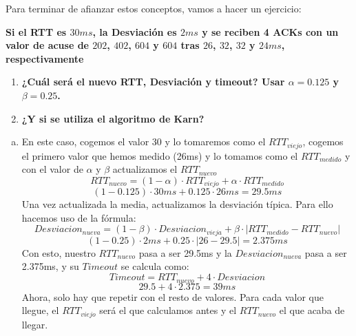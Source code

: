 \documentclass[10pt,a4paper,spanish]{report}
\begin{document}
Para terminar de afianzar estos conceptos, vamos a hacer un ejercicio: 

\textbf{Si el RTT es $30ms$, la Desviación es $2ms$ y se reciben 4 ACKs con un valor de acuse de $202$, $402$, $604$ y $604$ tras $26$, $32$, $32$ y $24 ms$, respectivamente}

\begin{enumerate}[\bf a)]
    \item \textbf{¿Cuál será el nuevo RTT, Desviación y timeout? Usar $\alpha=0.125$ y $\beta=0.25$.}
    \item \textbf{¿Y si se utiliza el algoritmo de Karn?}
\end{enumerate}

\begin{enumerate}[a)]
    \item En este caso, cogemos el valor 30 y lo tomaremos como el $RTT_{viejo}$, cogemos el primero valor que hemos medido (26ms) y lo tomamos como el $RTT_{medido}$ y con el valor de $\alpha$ y $\beta$ actualizamos el $RTT_{nuevo}$
    \begin{displaymath}
        RTT_{nuevo} = (1 - \alpha) \cdot RTT_{viejo} + \alpha \cdot RTT_{medido}
    \end{displaymath}
    \begin{displaymath}
        (1- 0.125) \cdot 30ms + 0.125 \cdot 26ms = 29.5ms
    \end{displaymath}
    Una vez actualizada la media, actualizamos la desviación típica. Para ello hacemos uso de la fórmula:
    \begin{displaymath}
        Desviacion_{nueva} = (1-\beta) \cdot Desviacion_{vieja} + \beta\cdot|RTT_{medido} - RTT_{nuevo}|
    \end{displaymath}
    \begin{displaymath}
        (1-0.25) \cdot 2ms + 0.25\cdot|26 - 29.5| = 2.375ms
    \end{displaymath}
    Con esto, nuestro $RTT_{nuevo}$ pasa a ser 29.5ms y la $Desviacion_{nueva}$ pasa a ser 2.375ms, y su $Timeout$ se calcula como:
    \begin{displaymath}
        Timeout = RTT_{nuevo} + 4 \cdot Desviacion
    \end{displaymath}
    \begin{displaymath}
        29.5+4\cdot2.375 = 39ms
    \end{displaymath}
    Ahora, solo hay que repetir con el resto de valores. Para cada valor que llegue, el $RTT_{viejo}$ será el que calculamos antes y el $RTT_{nuevo}$ el que acaba de llegar. 

\end{enumerate}
\end{document}

